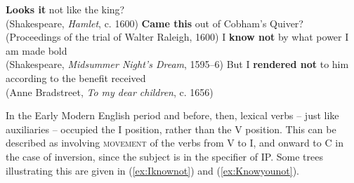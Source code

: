 \begin{exe}
    \ex \textbf{Looks it} not like the king?\\
    (Shakespeare, \textit{Hamlet}, c. 1600)
    \ex \textbf{Came this} out of Cobham's Quiver?\\
    (Proceedings of the trial of Walter Raleigh, 1600)
    \ex I \textbf{know not} by what power I am made bold\\
    (Shakespeare, \textit{Midsummer Night's Dream}, 1595--6)
    \ex But I \textbf{rendered not} to him according to the benefit received\\
    (Anne Bradstreet, \textit{To my dear children}, c. 1656)
\end{exe}

\noindent In the Early Modern English period and before, then, lexical verbs -- just like auxiliaries -- occupied the I position, rather than the V position. This can be described as involving \textsc{movement} of the verbs from V to I, and onward to C in the case of inversion, since the subject is in the specifier of IP. Some trees illustrating this are given in (\ref{ex:Iknownot}) and (\ref{ex:Knowyounot}).

\setlength{\columnsep}{-1cm}
\begin{multicols}{2}
\begin{exe}
\ex \label{ex:Iknownot}

\noindent\ex \label{ex:Knowyounot}
\end{exe}
\end{multicols}

